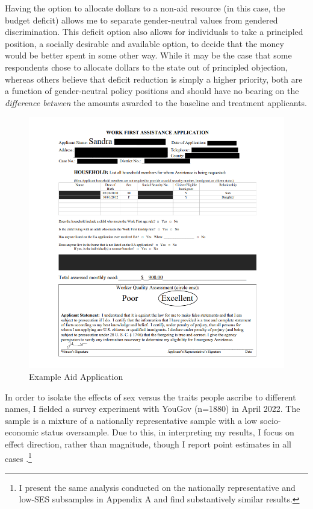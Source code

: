 \documentclass[12pt]{article}%
\begin{document}
\begin{doublespace}
Having the option to allocate dollars to a non-aid resource (in this case, the budget deficit) allows me to separate gender-neutral values from gendered discrimination. This deficit option also allows for individuals to take a principled position, a socially desirable and available option, to decide that the money would be better spent in some other way. While it may be the case that some respondents chose to allocate dollars to the state out of principled objection, whereas others believe that deficit reduction is simply a higher priority, both are a function of gender-neutral policy positions and should have no bearing on the \textit{difference between} the amounts awarded to the baseline and treatment applicants.

\begin{figure}[h!]
	\centering
	\includegraphics[scale=1]{figs/example_treatment.png}
	\caption{Example Aid Application}
	\label{figure2}
\end{figure}


In order to isolate the effects of sex versus the traits people ascribe to different names, I fielded a survey experiment with YouGov (n=1880) in April 2022. The sample is a mixture of a nationally representative sample with a low socio-economic status oversample. Due to this, in interpreting my results, I focus on effect direction, rather than magnitude, though I report point estimates in all cases \citep{horton2011online}.\footnote{I present the same analysis conducted on the nationally representative and low-SES subsamples in Appendix A and find substantively similar results.} 


\end{doublespace}
\end{document}
